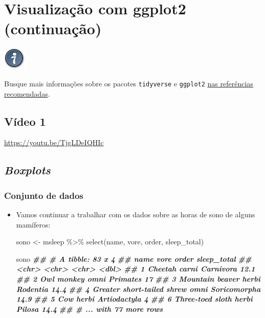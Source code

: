 \documentclass[
  11pt]{report}
\newenvironment{Shaded}{\begin{snugshade}}{\end{snugshade}}
\newcommand{\DocumentationTok}[1]{\textcolor[rgb]{0.56,0.35,0.01}{\textbf{\textit{#1}}}}
\newcommand{\FunctionTok}[1]{\textcolor[rgb]{0.00,0.00,0.00}{#1}}
\newcommand{\NormalTok}[1]{#1}
\newcommand{\OtherTok}[1]{\textcolor[rgb]{0.56,0.35,0.01}{#1}}
\newcommand{\SpecialCharTok}[1]{\textcolor[rgb]{0.00,0.00,0.00}{#1}}
\newenvironment{rmdtip}
{
  \begin{mytip}
    \includegraphics{images/tip.png}
    \tcblower
  }
  {
  \end{mytip}
}
\renewenvironment{Shaded}{
  \begin{mdframed}[%
    roundcorner=2pt,%
    innerleftmargin=5pt,%
    innerrightmargin=5pt,%
    topline=true,%
    leftline=true,%
    rightline=true,%
    bottomline=true,%
    linewidth=0.5pt,%
    linecolor=black!20,%
    backgroundcolor=black!2,%
    skipabove=2ex,%
    skipbelow=2.5ex%
  ]%
}
{
  \end{mdframed}
}
\begin{document}
\hypertarget{viz2}{%
\chapter{Visualização com ggplot2 (continuação)}\label{viz2}}

\begin{rmdtip}
Busque mais informações sobre os pacotes \texttt{tidyverse} e \texttt{ggplot2} \protect\hyperlink{refrec}{nas referências recomendadas}.

\end{rmdtip}

\hypertarget{vuxeddeo-1-3}{%
\section{Vídeo 1}\label{vuxeddeo-1-3}}

\begin{center} \url{https://youtu.be/TjgLDeIQHIc} \end{center}

\hypertarget{boxplots}{%
\section{\texorpdfstring{\emph{Boxplots}}{Boxplots}}\label{boxplots}}

\hypertarget{conjunto-de-dados-1}{%
\subsection{Conjunto de dados}\label{conjunto-de-dados-1}}

\begin{itemize}
\item
  Vamos continuar a trabalhar com os dados sobre as horas de sono de alguns mamíferos:

\begin{Shaded}
\begin{Highlighting}[]
\NormalTok{sono }\OtherTok{\textless{}{-}}\NormalTok{ msleep }\SpecialCharTok{\%\textgreater{}\%} 
  \FunctionTok{select}\NormalTok{(name, vore, order, sleep\_total)}

\NormalTok{sono}
\DocumentationTok{\#\# \# A tibble: 83 x 4}
\DocumentationTok{\#\#   name                       vore  order        sleep\_total}
\DocumentationTok{\#\#   \textless{}chr\textgreater{}                      \textless{}chr\textgreater{} \textless{}chr\textgreater{}              \textless{}dbl\textgreater{}}
\DocumentationTok{\#\# 1 Cheetah                    carni Carnivora           12.1}
\DocumentationTok{\#\# 2 Owl monkey                 omni  Primates            17  }
\DocumentationTok{\#\# 3 Mountain beaver            herbi Rodentia            14.4}
\DocumentationTok{\#\# 4 Greater short{-}tailed shrew omni  Soricomorpha        14.9}
\DocumentationTok{\#\# 5 Cow                        herbi Artiodactyla         4  }
\DocumentationTok{\#\# 6 Three{-}toed sloth           herbi Pilosa              14.4}
\DocumentationTok{\#\# \# ... with 77 more rows}
\end{Highlighting}
\end{Shaded}
\end{itemize}
\end{document}
